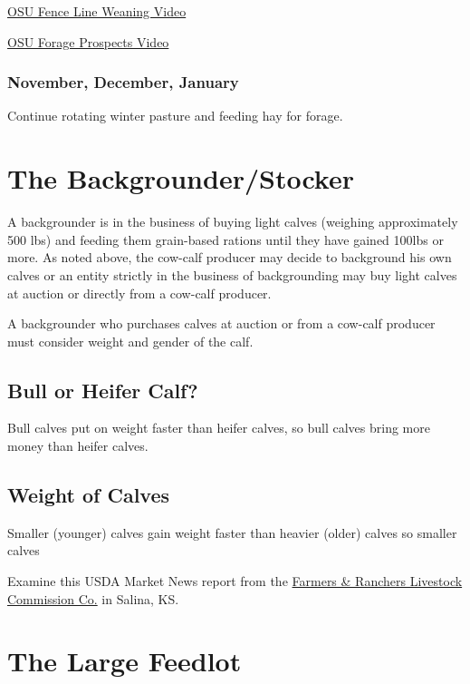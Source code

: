 \documentclass[
  letterpaper,
  DIV=11,
  numbers=noendperiod]{scrreprt}
\begin{document}
\href{https://www.youtube.com/watch?v=qpGuOOA-fYU}{OSU Fence Line
Weaning Video}

\href{https://www.youtube.com/watch?v=JyvTl9PVdMQ\#action=share}{OSU
Forage Prospects Video}

\subsubsection{November, December,
January}\label{november-december-january}

Continue rotating winter pasture and feeding hay for forage.

\section{The Backgrounder/Stocker}\label{the-backgrounderstocker}

A backgrounder is in the business of buying light calves (weighing
approximately 500 lbs) and feeding them grain-based rations until they
have gained 100lbs or more. As noted above, the cow-calf producer may
decide to background his own calves or an entity strictly in the
business of backgrounding may buy light calves at auction or directly
from a cow-calf producer.

A backgrounder who purchases calves at auction or from a cow-calf
producer must consider weight and gender of the calf.

\subsection{Bull or Heifer Calf?}\label{bull-or-heifer-calf}

Bull calves put on weight faster than heifer calves, so bull calves
bring more money than heifer calves.

\subsection{Weight of Calves}\label{weight-of-calves}

Smaller (younger) calves gain weight faster than heavier (older) calves
so smaller calves

Examine this USDA Market News report from the
\href{http://www.ams.usda.gov/mnreports/dc_ls143.txt}{Farmers \&
Ranchers Livestock Commission Co.} in Salina, KS.

\section{The Large Feedlot}\label{the-large-feedlot}
\end{document}
